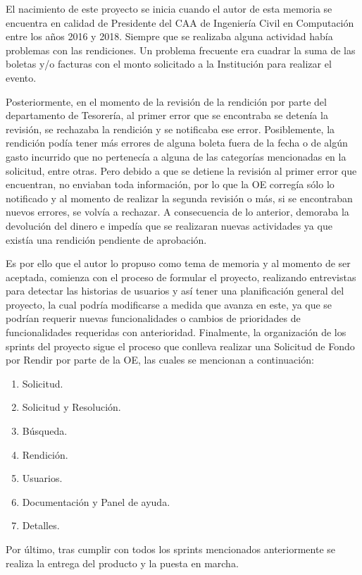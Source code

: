 El nacimiento de este proyecto se inicia cuando el autor de esta memoria se encuentra en calidad de Presidente del CAA de Ingeniería Civil en Computación entre los años 2016 y 2018. Siempre que se realizaba alguna actividad había problemas con las rendiciones. Un problema frecuente era cuadrar la suma de las boletas y/o facturas con el monto solicitado a la Institución para realizar el evento. 

Posteriormente, en el momento de la revisión de la rendición por parte del departamento de Tesorería, al primer error que se encontraba se detenía la revisión, se rechazaba la rendición y se notificaba ese error. Posiblemente, la rendición podía tener más errores de alguna boleta fuera de la fecha o de algún gasto incurrido que no pertenecía a alguna de las categorías mencionadas en la solicitud, entre otras. Pero debido a que se detiene la revisión al primer error que encuentran, no enviaban toda información, por lo que la OE corregía sólo lo notificado y al momento de realizar la segunda revisión o más, si se encontraban nuevos errores, se volvía a rechazar. A consecuencia de lo anterior, demoraba la devolución del dinero e impedía que se realizaran nuevas actividades ya que existía una rendición pendiente de aprobación.

Es por ello que el autor lo propuso como tema de memoria y al momento de ser aceptada, comienza con el proceso de formular el proyecto, realizando entrevistas para detectar las historias de usuarios y así tener una planificación general del proyecto, la cual podría modificarse a medida que avanza en este, ya que se podrían requerir nuevas funcionalidades o cambios de prioridades de funcionalidades requeridas con anterioridad. Finalmente, la organización de los sprints del proyecto sigue el proceso que conlleva realizar una Solicitud de Fondo por Rendir por parte de la OE, las cuales se mencionan a continuación:

\begin{enumerate}
    \item Solicitud.
    \item Solicitud y Resolución.
    \item Búsqueda.
    \item Rendición.
    \item Usuarios.
    \item Documentación y Panel de ayuda.
    \item Detalles.
\end{enumerate}

Por último, tras cumplir con todos los sprints mencionados anteriormente se realiza la entrega del producto y la puesta en marcha.






